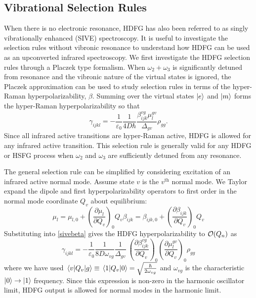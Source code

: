 \documentclass[aip, jcp, reprint, onecolumn]{revtex4-2}
\begin{document}
\subsection{Vibrational Selection Rules}

When there is no electronic resonance, HDFG has also been referred to as singly vibrationally enhanced (SIVE) spectroscopy. \cite{RN352}
It is useful to investigate the selection rules without vibronic resonance to understand how HDFG can be used as an upconverted infrared spectroscopy.
We first investigate the HDFG selection rules through a Placzek type formalism.
When $\omega_2+\omega_3$ is significantly detuned from resonance and the vibronic nature of the virtual states is ignored, the Placzek approximation can be used to study selection rules in terms of the hyper-Raman hyperpolarizability, $\beta$. \cite{Placzek1934, Long1970, Altmann1982}
Summing over the virtual states $\ket{e}$ and $\ket{m}$ forms the hyper-Raman hyperpolarizability so that\cite{Long1970} 
\begin{equation}\label{sivebeta}
	\gamma_{ijkl} =	-\frac{1}{\varepsilon_0} \frac{1}{4D \hbar}\frac{\beta^{vg}_{ijk} \mu^{gv}_{l}}{\Delta_{gv}} \rho_{gg}.
\end{equation}
Since all infrared active transitions are hyper-Raman active, HDFG is allowed for any infrared active transition. \cite{Andrews1978}
This selection rule is generally valid for any HDFG or HSFG process when $\omega_2$ and $\omega_3$ are sufficiently detuned from any resonance.

The general selection rule can be simplified by considering excitation of an infrared active normal mode.  
Assume state $v$ is the $v^{\text{th}}$ normal mode.
We Taylor expand the dipole and first hyperpolarizability operators to first order in the normal mode coordinate $Q_v$ about equilibrium:\cite{Long1970, Shen90}
\begin{subequations}
	\begin{equation}
		\mu_l = \mu_{l,0} + \left(\frac{\partial \mu_l}{\partial Q_v}\right)_0 Q_v 
	\end{equation}
	\begin{equation}
		\beta_{ijk} = \beta_{ijk,0} + \left(\frac{\partial \beta_{ijk}}{\partial Q_v}\right)_0 Q_v
	\end{equation}
\end{subequations}
Substituting into \autoref{sivebeta} gives the HDFG hyperpolarizability to $\order{Q_n}$ as \begin{equation}\label{SIVEselection}
	\gamma_{ijkl} =	-\frac{1}{\varepsilon_0} \frac{1}{8D \omega_{vg}}  \frac{1}{{\Delta_{gv}}} \ \left(\frac{\partial \beta^{vg}_{ijk}}{\partial Q_v}\right)_0 \left({\frac{\partial \mu^{gv}_{l}}{\partial Q_v}}\right)_0  \rho_{gg}
\end{equation}
where we have used $\mel{v}{Q_v}{g} \equiv \mel{1}{Q_v}{0} = \sqrt{\frac{\hbar}{2\omega_{vg}}}$ and $\omega_{vg}$ is the characteristic $\ket{0} \rightarrow \ket{1}$ frequency.\cite{RN459}
Since this expression is non-zero in the harmonic oscillator limit, HDFG output is allowed for normal modes in the harmonic limit. 
\end{document}

